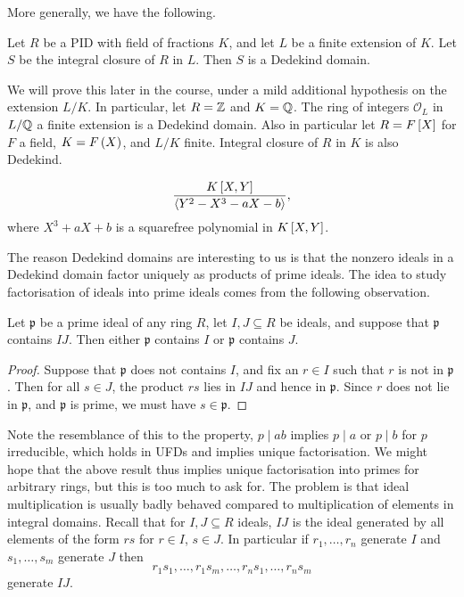 More generally, we have the following.

\begin{theorem}
Let $ R $ be a PID with field of fractions $ K $, and let $ L $ be a finite extension of $ K $. Let $ S $ be the integral closure of $ R $ in $ L $. Then $ S $ is a Dedekind domain.
\end{theorem}

We will prove this later in the course, under a mild additional hypothesis on the extension $ L / K $. In particular, let $ R = \Z $ and $ K = \Q $. The ring of integers $ \mathcal{O}_L $ in $ L / \Q $ a finite extension is a Dedekind domain. Also in particular let $ R = F\sb{X} $ for $ F $ a field, $ K = F\rb{X} $, and $ L / K $ finite. Integral closure of $ R $ in $ K $ is also Dedekind.

\begin{example2}
$$ \dfrac{K\sb{X, Y}}{\ab{Y^2 - X^3 - aX - b}}, $$
where $ X^3 + aX + b $ is a squarefree polynomial in $ K\sb{X, Y} $.
\end{example2}

The reason Dedekind domains are interesting to us is that the nonzero ideals in a Dedekind domain factor uniquely as products of prime ideals. The idea to study factorisation of ideals into prime ideals comes from the following observation.

\begin{lemma}
\label{lem:11.1.3}
Let $ \mathfrak{p} $ be a prime ideal of any ring $ R $, let $ I, J \subseteq R $ be ideals, and suppose that $ \mathfrak{p} $ contains $ IJ $. Then either $ \mathfrak{p} $ contains $ I $ or $ \mathfrak{p} $ contains $ J $.
\end{lemma}

\begin{proof}
Suppose that $ \mathfrak{p} $ does not contains $ I $, and fix an $ r \in I $ such that $ r $ is not in $ \mathfrak{p} $. Then for all $ s \in J $, the product $ rs $ lies in $ IJ $ and hence in $ \mathfrak{p} $. Since $ r $ does not lie in $ \mathfrak{p} $, and $ \mathfrak{p} $ is prime, we must have $ s \in \mathfrak{p} $.
\end{proof}

Note the resemblance of this to the property, $ p \mid ab $ implies $ p \mid a $ or $ p \mid b $ for $ p $ irreducible, which holds in UFDs and implies unique factorisation. We might hope that the above result thus implies unique factorisation into primes for arbitrary rings, but this is too much to ask for. The problem is that ideal multiplication is usually badly behaved compared to multiplication of elements in integral domains. Recall that for $ I, J \subseteq R $ ideals, $ IJ $ is the ideal generated by all elements of the form $ rs $ for $ r \in I $, $ s \in J $. In particular if $ r_1, \dots, r_n $ generate $ I $ and $ s_1, \dots, s_m $ generate $ J $ then
$$ r_1s_1, \dots, r_1s_m, \dots, r_ns_1, \dots, r_ns_m $$
generate $ IJ $.

